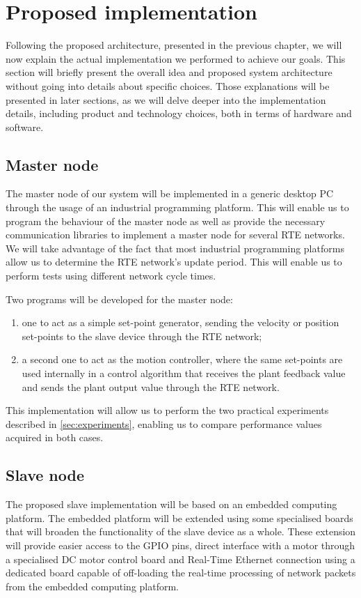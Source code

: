 \section{Proposed implementation}
Following the proposed architecture, presented in the previous chapter, we will now explain the actual implementation we performed to achieve our goals.
This section will briefly present the overall idea and proposed system architecture without going into details about specific choices.
Those explanations will be presented in later sections, as we will delve deeper into the implementation details, including product and technology choices, both in terms of hardware and software.

\subsection{Master node}
The master node of our system will be implemented in a generic desktop PC through the usage of an industrial programming platform.
This will enable us to program the behaviour of the master node as well as provide the necessary communication libraries to implement a master node for several RTE networks.
We will take advantage of the fact that most industrial programming platforms allow us to determine the RTE network's update period.
This will enable us to perform tests using different network cycle times.

Two programs will be developed for the master node:
\begin{enumerate}
	\item one to act as a simple set-point generator, sending the velocity or position set-points to the slave device through the RTE network;
	\item a second one to act as the motion controller, where the same set-points are used internally in a control algorithm that receives the plant feedback value and sends the plant output value through the RTE network.
\end{enumerate}

This implementation will allow us to perform the two practical experiments described in \autoref{sec:experiments}, enabling us to compare performance values acquired in both cases.

\subsection{Slave node}
The proposed slave implementation will be based on an embedded computing platform.
The embedded platform will be extended using some specialised boards that will broaden the functionality of the slave device as a whole.
These extension will provide easier access to the GPIO pins, direct interface with a motor through a specialised DC motor control board and Real-Time Ethernet connection using a dedicated board capable of off-loading the real-time processing of network packets from the embedded computing platform.

